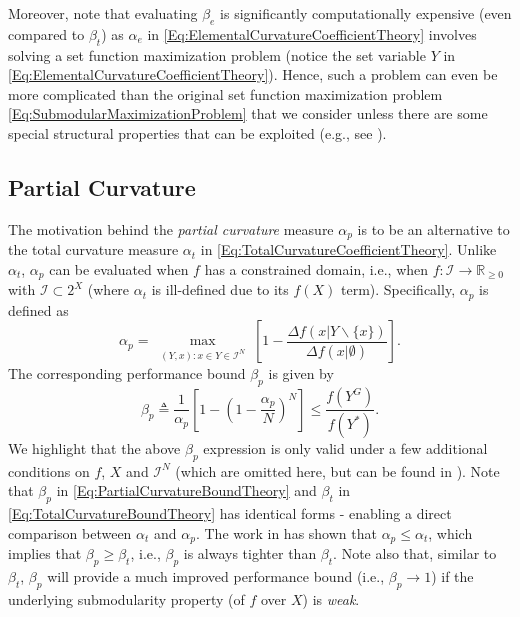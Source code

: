 \documentclass[conference]{IEEEtran}
\newcommand{\R}{\mathbb{R}}
\begin{document}
Moreover, note that evaluating $\beta_e$ is significantly computationally expensive (even compared to $\beta_t$) as $\alpha_e$ in \eqref{Eq:ElementalCurvatureCoefficientTheory} involves solving a set function maximization problem (notice the set variable $Y$ in \eqref{Eq:ElementalCurvatureCoefficientTheory}). Hence, such a problem can even be more complicated than the original set function maximization problem \eqref{Eq:SubmodularMaximizationProblem} that we consider unless there are some special structural properties that can be exploited (e.g., see \cite{Sun2019}).



\subsection{Partial Curvature \cite{Liu2018}}
\label{SubSec:PartialCurvature}



The motivation behind the \emph{partial curvature} measure $\alpha_p$ is to be an alternative to the total curvature measure $\alpha_t$ in \eqref{Eq:TotalCurvatureCoefficientTheory}. Unlike $\alpha_t$, $\alpha_p$ can be evaluated when $f$ has a constrained domain, i.e., when $f:\mathcal{I}\rightarrow \R_{\geq0}$ with $\mathcal{I} \subset 2^X$ (where $\alpha_t$ is ill-defined due to its $f(X)$ term). Specifically, $\alpha_p$ is defined as
\begin{equation}\label{Eq:PartialCurvatureCoefficientTheory}
    \alpha_p = 
    \max_{\substack{(Y,x): x \in Y \in \mathcal{I}^N}}\left[1-\frac{\Delta f(x \vert Y \backslash \{x\}) }{\Delta f(x \vert \emptyset)}\right].
\end{equation}
The corresponding performance bound $\beta_p$ is given by 
\begin{equation}\label{Eq:PartialCurvatureBoundTheory}
    \beta_p \triangleq \frac{1}{\alpha_p}\left[1-\left(1-\frac{\alpha_p}{N}\right)^N\right] \leq \frac{f(Y^G)}{f(Y^*)}.
\end{equation}
We highlight that the above $\beta_p$ expression is only valid under a few additional conditions on $f$, $X$ and $\mathcal{I}^N$ (which are omitted here, but can be  found in \cite{Liu2018}). Note that $\beta_p$ in \eqref{Eq:PartialCurvatureBoundTheory} and $\beta_t$ in \eqref{Eq:TotalCurvatureBoundTheory} has identical forms - enabling a direct comparison between $\alpha_t$ and $\alpha_p$. The work in \cite{Liu2018} has shown that $\alpha_p \leq \alpha_t$, which implies that $\beta_p \geq \beta_t$, i.e., $\beta_p$ is always tighter than $\beta_t$. Note also that, similar to $\beta_t$, $\beta_p$ will provide a much improved performance bound (i.e., $\beta_p \rightarrow 1$) if the underlying submodularity property (of $f$ over $X$) is \emph{weak}.  
\end{document}
